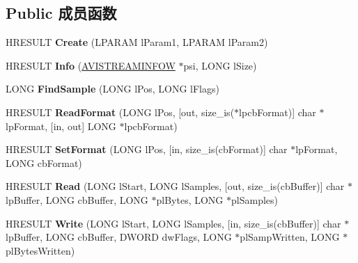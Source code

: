 \subsection*{Public 成员函数}
\begin{DoxyCompactItemize}
\item 
\mbox{\label{interface_i_a_v_i_stream_aa28ae8ae88e6fcda0f56161f49589657}} 
H\+R\+E\+S\+U\+LT {\bfseries Create} (L\+P\+A\+R\+AM l\+Param1, L\+P\+A\+R\+AM l\+Param2)
\item 
\mbox{\label{interface_i_a_v_i_stream_a3869e5f9224d3b7c897fbd3d0404ec88}} 
H\+R\+E\+S\+U\+LT {\bfseries Info} (\hyperlink{struct___a_v_i_s_t_r_e_a_m_i_n_f_o_w}{A\+V\+I\+S\+T\+R\+E\+A\+M\+I\+N\+F\+OW} $\ast$psi, L\+O\+NG l\+Size)
\item 
\mbox{\label{interface_i_a_v_i_stream_a88b6aa5f46fd822441310efe95c32ef3}} 
L\+O\+NG {\bfseries Find\+Sample} (L\+O\+NG l\+Pos, L\+O\+NG l\+Flags)
\item 
\mbox{\label{interface_i_a_v_i_stream_a3dd62c9d2a936b7ed62edc7ba67db846}} 
H\+R\+E\+S\+U\+LT {\bfseries Read\+Format} (L\+O\+NG l\+Pos, \mbox{[}out, size\+\_\+is($\ast$lpcb\+Format)\mbox{]} char $\ast$lp\+Format, \mbox{[}in, out\mbox{]} L\+O\+NG $\ast$lpcb\+Format)
\item 
\mbox{\label{interface_i_a_v_i_stream_a6b7ccd73549b8858148fe27fe4ca8256}} 
H\+R\+E\+S\+U\+LT {\bfseries Set\+Format} (L\+O\+NG l\+Pos, \mbox{[}in, size\+\_\+is(cb\+Format)\mbox{]} char $\ast$lp\+Format, L\+O\+NG cb\+Format)
\item 
\mbox{\label{interface_i_a_v_i_stream_a961779bed0499988541d6035efa0eec7}} 
H\+R\+E\+S\+U\+LT {\bfseries Read} (L\+O\+NG l\+Start, L\+O\+NG l\+Samples, \mbox{[}out, size\+\_\+is(cb\+Buffer)\mbox{]} char $\ast$lp\+Buffer, L\+O\+NG cb\+Buffer, L\+O\+NG $\ast$pl\+Bytes, L\+O\+NG $\ast$pl\+Samples)
\item 
\mbox{\label{interface_i_a_v_i_stream_a0bd69128dabbf86909855ea6a1e771d6}} 
H\+R\+E\+S\+U\+LT {\bfseries Write} (L\+O\+NG l\+Start, L\+O\+NG l\+Samples, \mbox{[}in, size\+\_\+is(cb\+Buffer)\mbox{]} char $\ast$lp\+Buffer, L\+O\+NG cb\+Buffer, D\+W\+O\+RD dw\+Flags, L\+O\+NG $\ast$pl\+Samp\+Written, L\+O\+NG $\ast$pl\+Bytes\+Written)

\end{DoxyCompactItemize}
